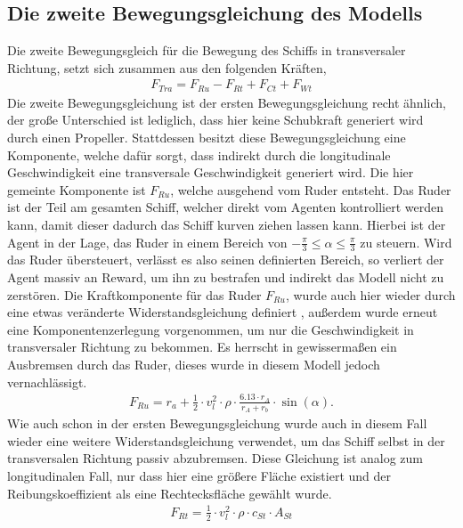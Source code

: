 \documentclass[]{iat}
\begin{document}
\subsection{Die zweite Bewegungsgleichung des Modells} \label{sec:eom2}
Die zweite Bewegungsgleich für die Bewegung des Schiffs in transversaler Richtung, setzt sich zusammen aus den folgenden Kräften,
\begin{align}
    F_{Tra} = F_{Ru} - F_{Rt} + F_{Ct} + F_{Wt}
\end{align}
Die zweite Bewegungsgleichung ist der ersten Bewegungsgleichung recht ähnlich, der große Unterschied ist lediglich, dass hier keine Schubkraft generiert wird durch einen Propeller. Stattdessen besitzt diese Bewegungsgleichung eine Komponente, welche dafür sorgt, dass indirekt durch die longitudinale Geschwindigkeit eine transversale Geschwindigkeit generiert wird. Die hier gemeinte Komponente ist $F_{Ru}$, welche ausgehend vom Ruder entsteht. Das Ruder ist der Teil am gesamten Schiff, welcher direkt vom Agenten kontrolliert werden kann, damit dieser dadurch das Schiff kurven ziehen lassen kann. Hierbei ist der Agent in der Lage, das Ruder in einem Bereich von $-\frac{\pi}{3} \leq \alpha \leq \frac{\pi}{3}$ zu steuern. Wird das Ruder übersteuert, verlässt es also seinen definierten Bereich, so verliert der Agent massiv an Reward, um ihn zu bestrafen und indirekt das Modell nicht zu zerstören. Die Kraftkomponente für das Ruder $F_{Ru}$, wurde auch hier wieder durch eine etwas veränderte Widerstandsgleichung definiert \cite[]{Kulczyk_Tabaczek_2014_2}, außerdem wurde erneut eine Komponentenzerlegung vorgenommen, um nur die Geschwindigkeit in transversaler Richtung zu bekommen. Es herrscht in gewissermaßen ein Ausbremsen durch das Ruder, dieses wurde in diesem Modell jedoch vernachlässigt.
\begin{align}
    F_{Ru} = r_a + \frac{1}{2} \cdot v_l^2 \cdot \rho \cdot \frac{6.13 \cdot r_A}{r_A + r_b} \cdot \sin(\alpha). \label{eq:rudder_resistance_long}
\end{align}
Wie auch schon in der ersten Bewegungsgleichung wurde auch in diesem Fall wieder eine weitere Widerstandsgleichung verwendet, um das Schiff selbst in der transversalen Richtung passiv abzubremsen. Diese Gleichung ist analog zum longitudinalen Fall, nur dass hier eine größere Fläche existiert und der Reibungskoeffizient als eine Rechtecksfläche gewählt wurde.
\begin{align}
    F_{Rt} = \frac{1}{2} \cdot v_l^2 \cdot \rho \cdot c_{St} \cdot A_{St} \label{eq:side_resistance}
\end{align}
\end{document}
